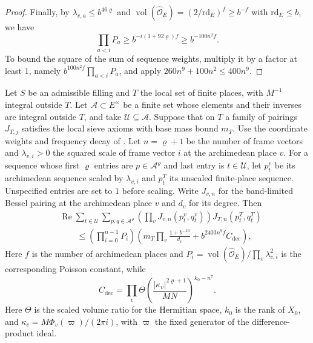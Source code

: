 \begin{proof}
Finally, by $\lambda_{v,a}\le b^{46\varrho}$ and
$\operatorname{vol}(\widehat{\mathcal O}_E)=(2/\mathrm{rd}_E)^f\ge b^{-f}$ with $\mathrm{rd}_E\le b$, we have
\[
 \prod_{a<i}P_a\ge b^{-i(1+92\varrho)f}\ge b^{-100n^2f}.
\]
To bound the square of the sum of sequence weights, multiply it by a factor at least $1$,
namely $b^{100n^2f}\prod_{a<i}P_a$, and apply $260n^9+100n^2\le400n^9$.
\end{proof}

\begin{lemma}
\label{lem:b-poisson-sieve}
\emitthmsource
Let $S$ be an admissible filling and $T$ the local set of finite places, with $M^{-1}$ integral outside $T$.
Let $\mathcal A\subset E^\times$ be a finite set whose elements and their inverses are integral outside $T$,
and take $\mathcal U\subseteq\mathcal A$.
Suppose that on $T$ a family of pairings $J_{T,j}$ satisfies the local sieve axioms with base mass bound $m_T$.
Use the coordinate weights and frequency decay of .
Let $n=\varrho+1$ be the number of frame vectors and $\lambda_{v,i}>0$ the squared scale of frame vector $i$ at the archimedean place $v$.
For a sequence whose first $\varrho$ entries are $p\in\mathcal A^\varrho$ and last entry is $t\in\mathcal U$,
let $p^v_t$ be its archimedean sequence scaled by $\lambda_{v,i}$ and
$p^T_t$ its unscaled finite-place sequence. Unspecified entries are set to $1$ before scaling.
Write $J_{v,n}$ for the band-limited Bessel pairing at the archimedean place $v$ and $d_v$ for its degree.
Then
\[
 \begin{aligned}
 &\operatorname{Re}\sum_{t\in\mathcal U}
      \sum_{p,q\in\mathcal A^\varrho}
      \left(\prod_v J_{v,n}(p^v_t,q^v_t)\right)J_{T,n}(p^T_t,q^T_t)\\
 &\qquad\le
 \left(\prod_{i=0}^{n-1} P_i\right)
 \left(m_T\prod_v\frac{1+b^{-10}}{d_v}
                 +b^{2403n^9f}C_{\mathrm{dec}}\right),
 \end{aligned}
\]
Here $f$ is the number of archimedean places and $P_i=\operatorname{vol}(\widehat{\mathcal O}_E)/\prod_v\lambda_{v,i}^2$
is the corresponding Poisson constant, while
\[
 C_{\mathrm{dec}}=\prod_v \Theta\left(
      \frac{|\kappa_v|^{2\varrho+1}}{MN}\right)^{k_0-n^7}.
\]
Here $\Theta$ is the scaled volume ratio for the Hermitian space, $k_0$ is the rank of $X_0$,
and $\kappa_v=M\Phi_v(\varpi)/(2\pi i)$, with $\varpi$ the fixed generator of the difference-product ideal.
\end{lemma}
